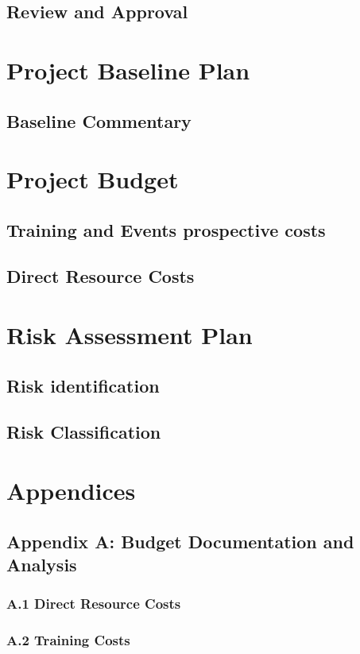 \subsection{Review and Approval}

\section{Project Baseline Plan}
\subsection{Baseline Commentary}

\section{Project Budget}
\subsection{Training and Events prospective costs}
\subsection{Direct Resource Costs}

\section{Risk Assessment Plan}
\subsection{Risk identification}
\subsection{Risk Classification}

\section*{Appendices}
\subsection*{Appendix A: Budget Documentation and Analysis}
\subsubsection*{A.1 Direct Resource Costs}
\subsubsection*{A.2 Training Costs}
